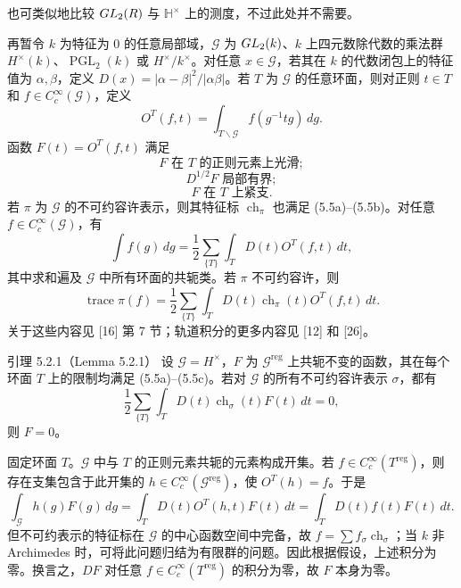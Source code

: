 也可类似地比较 $GL_2(R)$ 与 $\mathbb H^\times$ 上的测度，不过此处并不需要。

再暂令 $k$ 为特征为 $0$ 的任意局部域，$\mathcal G$ 为 $GL_2(k)$、$k$ 上四元数除代数的乘法群 $H^\times(k)$、$\operatorname{PGL}_2(k)$ 或 $H^\times/k^\times$。对任意 $x\in\mathcal G$，若其在 $k$ 的代数闭包上的特征值为 $\alpha,\beta$，定义 $D(x)=|\alpha-\beta|^2/|\alpha\beta|$。若 $T$ 为 $\mathcal G$ 的任意环面，则对正则 $t\in T$ 和 $f\in C_c^\infty(\mathcal G)$，定义
\[
 O^T(f,t)=\int_{T\backslash\mathcal G}f(g^{-1}tg)\,dg.
\]
函数 $F(t)=O^T(f,t)$ 满足
\begin{equation}
 F\text{ 在 }T\text{ 的正则元素上光滑};\tag{5.5a}
\end{equation}
\begin{equation}
 D^{1/2}F\text{ 局部有界};\tag{5.5b}
\end{equation}
\begin{equation}
 F\text{ 在 }T\text{ 上紧支}.\tag{5.5c}
\end{equation}
若 $\pi$ 为 $\mathcal G$ 的不可约容许表示，则其特征标 $\operatorname{ch}_\pi$ 也满足 (5.5a)--(5.5b)。对任意 $f\in C_c^\infty(\mathcal G)$，有
\[
 \int f(g)\,dg=\frac12\sum_{\{T\}}\int_TD(t)O^T(f,t)\,dt,
\]
其中求和遍及 $\mathcal G$ 中所有环面的共轭类。若 $\pi$ 不可约容许，则
\begin{equation}
 \operatorname{trace}\pi(f)=\frac12\sum_{\{T\}}
 \int_TD(t)\operatorname{ch}_\pi(t)O^T(f,t)\,dt.
 \tag{5.6}
\end{equation}
关于这些内容见 [16] 第 7 节；轨道积分的更多内容见 [12] 和 [26]。

\begin{originaltheorem}{引理 5.2.1（Lemma 5.2.1）}
设 $\mathcal G=H^\times$，$F$ 为 $\mathcal G^{\mathrm{reg}}$ 上共轭不变的函数，其在每个环面 $T$ 上的限制均满足 (5.5a)--(5.5c)。若对 $\mathcal G$ 的所有不可约容许表示 $\sigma$，都有
\[
 \frac12\sum_{\{T\}}\int_TD(t)\operatorname{ch}_\sigma(t)F(t)\,dt=0,
\]
则 $F=0$。
\end{originaltheorem}

固定环面 $T$。$\mathcal G$ 中与 $T$ 的正则元素共轭的元素构成开集。若 $f\in C_c^\infty(T^{\mathrm{reg}})$，则存在支集包含于此开集的 $h\in C_c^\infty(\mathcal G^{\mathrm{reg}})$，使 $O^T(h)=f$。于是
\[
 \int_{\mathcal G}h(g)F(g)\,dg
 =\int_TD(t)O^T(h,t)F(t)\,dt
 =\int_TD(t)f(t)F(t)\,dt.
\]
但不可约表示的特征标在 $\mathcal G$ 的中心函数空间中完备，故 $f=\sum f_\sigma\operatorname{ch}_\sigma$；当 $k$ 非 Archimedes 时，可将此问题归结为有限群的问题。因此根据假设，上述积分为零。换言之，$DF$ 对任意 $f\in C_c^\infty(T^{\mathrm{reg}})$ 的积分为零，故 $F$ 本身为零。

